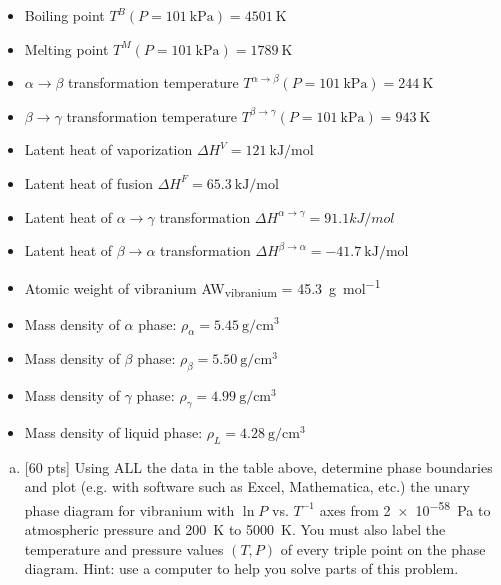\begin{enumerate}
    \begin{itemize}
      \item Boiling point $T^B(P = \SI{101}{\kilo\pascal}) = \SI{4501}{\kelvin}$
      \item Melting point $T^M(P = \SI{101}{\kilo\pascal}) = \SI{1789}{\kelvin}$
      \item $\alpha \rightarrow \beta$ transformation temperature
        $T^{\alpha\rightarrow\beta}(P = \SI{101}{\kilo\pascal}) =
        \SI{244}{\kelvin}$
      \item $\beta\rightarrow\gamma$ transformation temperature
        $T^{\beta\rightarrow\gamma}(P = \SI{101}{\kilo\pascal}) =
        \SI{943}{\kelvin}$
      \item Latent heat of vaporization $\Delta H^V =
        \SI{121}{\kilo\joule\per\mole}$
      \item Latent heat of fusion $\Delta H^F =
        \SI{65.3}{\kilo\joule\per\mole}$
      \item Latent heat of $\alpha \rightarrow \gamma$ transformation
        $\Delta H^{\alpha\rightarrow\gamma} = 91.1 kJ/mol$
      \item Latent heat of $\beta\rightarrow\alpha$ transformation
        $\Delta H^{\beta\rightarrow\alpha} =
        \SI{-41.7}{\kilo\joule\per\mole}$
      \item Atomic weight of vibranium AW\textsubscript{vibranium} =
        \SI{45.3}{\gram\per\mole}
      \item Mass density of $\alpha$ phase: $\rho_\alpha =
        \SI{5.45}{\gram\per\centi\meter\cubed}$
      \item Mass density of $\beta$ phase: $\rho_\beta =
        \SI{5.50}{\gram\per\centi\meter\cubed}$
      \item Mass density of $\gamma$ phase: $\rho_\gamma =
        \SI{4.99}{\gram\per\centi\meter\cubed}$
      \item Mass density of liquid phase: $\rho_L =
        \SI{4.28}{\gram\per\centi\meter\cubed}$
    \end{itemize}

    \begin{enumerate}[(a)]
      \item {[60 pts]} Using ALL the data in the table above,
        determine phase boundaries and plot (e.g. with
        software such as Excel, Mathematica, etc.) the unary phase
        diagram for vibranium with $\ln P$
        vs. $T^{-1}$ axes from \SI{2e-58}{Pa} to atmospheric pressure and
        \SI{200}{\kelvin} to \SI{5000}{\kelvin}. You must also
        label the temperature and pressure values $(T,P)$ of every
        triple point on the phase diagram.
        Hint: use a computer to help you solve parts of this problem.


\end{enumerate}
\end{enumerate}
